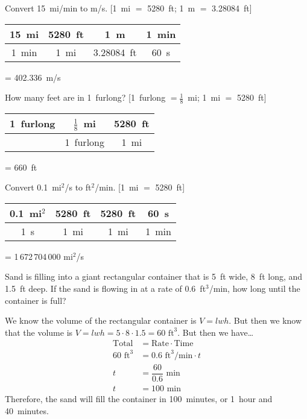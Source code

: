 \documentclass[11pt,letterpaper]{article}
\begin{document}
\newpage



 Convert 15~mi/min to m/s. [1~mi $=$ 5280~ft; 1~m $=$ 3.28084~ft] \pspace

\sol
	\begin{table}[!ht]
	\centering
	\begin{tabular}{c|c|c|c}
	15~mi & 5280~ft & 1~m & 1~min \\ \hline
	1~min & 1~mi & 3.28084~ft & 60~s
	\end{tabular}
	= 402.336~m/s
	\end{table}



\newpage



 How many feet are in 1~furlong? [1~furlong $= \frac{1}{8}$~mi; 1~mi $=$ 5280~ft] \pspace

\sol 
	\begin{table}[!ht]
	\centering
	\begin{tabular}{c|c|c}
	1~furlong & $\frac{1}{8}$~mi & 5280~ft \\ \hline
	 	        & 1~furlong & 1~mi
	\end{tabular}
	= 660~ft
	\end{table}



\newpage



 Convert 0.1~mi$^2$/s to ft$^2$/min. [1~mi $=$ 5280~ft] \pspace

\sol
	\begin{table}[!ht]
	\centering
	\begin{tabular}{c|c|c|c}
	0.1~mi$^2$ & 5280~ft & 5280~ft & 60~s \\ \hline
	1~s & 1~mi & 1~mi & 1~min
	\end{tabular}
	= 1\,672\,704\,000 mi$^2$/s
	\end{table}



\newpage



 Sand is filling into a giant rectangular container that is 5~ft wide, 8~ft long, and 1.5~ft deep. If the sand is flowing in at a rate of 0.6~ft$^3$/min, how long until the container is full? \pspace

\sol We know the volume of the rectangular container is $V= l w h$. But then we know that the volume is $V= lwh= 5 \cdot 8 \cdot 1.5= 60 \text{ ft}^3$. But then we have\dots \pspace
	\[
	\begin{aligned}
	\text{Total}&= \text{Rate} \cdot \text{Time} \\[0.3cm]
	60 \text{ ft}^3&= 0.6 \text{ ft}^3/\text{min} \cdot t \\[0.3cm]
	t&= \dfrac{60}{0.6} \text{ min} \\[0.3cm]
	t&=  100 \text{ min}
	\end{aligned}
	\]
Therefore, the sand will fill the container in 100~minutes, or 1~hour and 40~minutes. 
\end{document}
